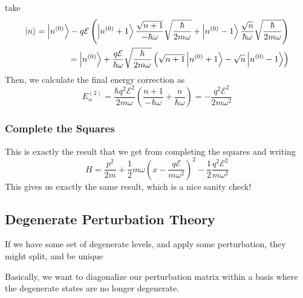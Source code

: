 \documentclass{article}
\theoremstyle{definition}
\begin{document}
take \begin{align} \ket{n}=\ket{n^{(0)}}-q\mathcal{E}\left(\ket{n^{(0)}+1}\frac{\sqrt{n+1}}{-\hbar\omega}\sqrt{ \frac{\hbar}{2m\omega}}+\ket{n^{(0)}-1}\frac{\sqrt{n}}{\hbar\omega}\sqrt{\frac{\hbar}{2m\omega}}\right) \\ =\ket{n^{(0)}}+\frac{q\mathcal{E}}{\hbar\omega}\sqrt{\frac{\hbar}{2m\omega}} \left(\sqrt{n+1}\ket{n^{(0)}+1}-\sqrt{n}\ket{n^{(0)}-1}\right) \end{align} Then, we calculate the final energy correction as \begin{equation} E_n^{(2)}= \frac{\hbar q^2\mathcal{E}^2}{2m\omega}\left(\frac{n+1}{-\hbar\omega}+\frac{n}{\hbar\omega}\right) = -\frac{q^2\mathcal{E}^2}{2m\omega^2} \end{equation} \subsubsection{Complete the Squares} This is exactly the result that we get from completing the squares and writing \begin{equation} H=\frac{p^2}{2m}+\frac{1}{2}m\omega\left(x-\frac{q\mathcal E}{m\omega^2}\right)^2-\frac{1}{2}\frac{q^2\mathcal{E}^2}{m\omega^2} \end{equation} This gives us exactly the same result, which is a nice sanity check! \subsection{Degenerate Perturbation Theory} If we have some set of degenerate levels, and apply some perturbation, they might split, and be unique \begin{center}  \end{center} Basically, we want to diagonalize our perturbation matrix within a basis where the degenerate states are no longer degenerate.
\end{document}
